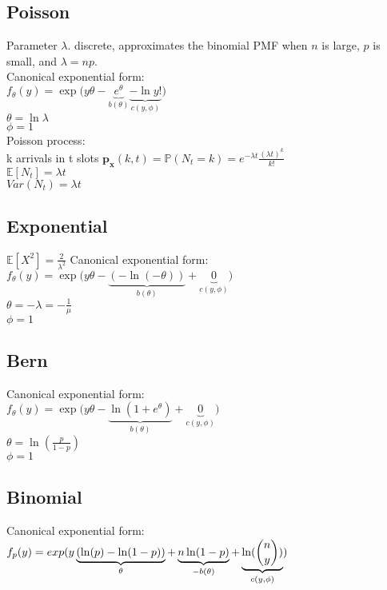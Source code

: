 \subsection*{Poisson}
Parameter $\lambda$. discrete, approximates the binomial PMF when $n$ is large, $p$ is small, and $\lambda = np$.\\


Canonical exponential form:\\

$ f_{\theta}(y) = \exp\big(y\theta - \underbrace{e^\theta}_{b(\theta)} \underbrace{- \ln y!}_{c(y, \phi)}\big)$\\
$\theta = \ln \lambda$\\
$\phi = 1$\\


Poisson process:\\
k arrivals in t slots
$\mathbf{p_x}(k,t) = \mathbb{P}(N_t=k)=e^{-\lambda t} \frac{(\lambda t)^k}{k!}$\\

$\mathbb{E}[N_t]=\lambda t$\\

$Var(N_t)=\lambda t$

\subsection*{Exponential}
$\mathbb{E}[X^2]=\frac{2}{\lambda^2}$
Canonical exponential form:\\
$f_{\theta}(y) = \exp\big(y\theta - \underbrace{(-\ln(-\theta))}_{b(\theta)} + \underbrace{0}_{c(y, \phi)}\big)$\\
$\theta = -\lambda = -\frac1{\mu}$\\
$\phi = 1$



\subsection{Bern}
Canonical exponential form:\\
$f_{\theta}(y)=\exp\big(y\theta - \underbrace{\ln(1 + e^\theta)}_{b(\theta)} + \underbrace{0}_{c(y, \phi)}\big) \quad$\\
$\theta = \ln\left(\frac{p}{1-p}\right)$\\
$\phi = 1$\\

\subsection*{Binomial}
Canonical exponential form:\\
$f_ p(y) =\\  
exp (y \underbrace{(\ln (p)-\ln (1-p))}_{\theta } + \underbrace{n\ln (1-p)}_{-b(\theta )} +\underbrace{\ln(\binom {n}{y})}_{c(y,\phi )} )$




